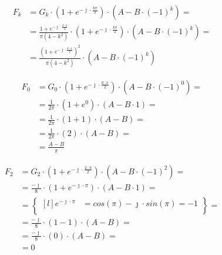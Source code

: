 \begin{task}
\begin{align*}
F_k&= G_k \cdot \left(1+ e^{-\jmath \cdot \frac{k\pi}{2}}\right) \cdot \left(A - B \cdot (-1)^k\right)=\\
&= \frac{1 + e^{-\jmath \cdot \frac{k \cdot \pi}{2}}}{\pi \left(4-k^2\right)} \cdot \left(1+ e^{-\jmath \cdot \frac{k\pi}{2}}\right) \cdot \left(A - B \cdot (-1)^k\right)=\\
&= \frac{\left(1 + e^{-\jmath \cdot \frac{k \cdot \pi}{2}}\right)^2}{\pi \left(4-k^2\right)} \cdot \left(A - B \cdot (-1)^k\right)
\end{align*}


\begin{align*}
F_0&= G_0 \cdot \left(1+ e^{-\jmath \cdot \frac{0 \cdot \pi}{2}}\right) \cdot \left(A - B \cdot (-1)^0\right)=\\
&=\frac{1}{2\pi} \cdot \left(1+ e^{0}\right) \cdot \left(A - B \cdot 1\right)=\\
&=\frac{1}{2\pi} \cdot \left(1+ 1\right) \cdot \left(A - B\right)=\\
&=\frac{1}{2\pi} \cdot \left(2\right) \cdot \left(A - B\right)=\\
&=\frac{A - B}{\pi}
\end{align*}


\begin{align*}
F_2&= G_2 \cdot \left(1+ e^{-\jmath \cdot \frac{2 \cdot \pi}{2}}\right) \cdot \left(A - B \cdot (-1)^2\right)=\\
&=\frac{-\jmath}{8} \cdot \left(1+ e^{-\jmath \cdot \pi}\right) \cdot \left(A - B \cdot 1\right)=\\
&=\begin{Bmatrix*}[l]
e^{-\jmath \cdot \pi} &= cos\left(\pi\right) -\jmath \cdot sin\left(\pi\right) = -1\\
\end{Bmatrix*}=\\
&=\frac{-\jmath}{8} \cdot \left(1 - 1\right) \cdot \left(A - B\right)=\\
&=\frac{-\jmath}{8} \cdot \left(0\right) \cdot \left(A - B\right)=\\
&=0
\end{align*}



\end{task}
